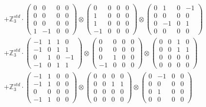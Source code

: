 \documentclass{article}
\begin{document}
{\begin{align}
        &+ \label{Rs16_Rc11_Solutions_Solution_6-c25} \mathbb{Z}_3^{std} \cdot 
            \begin{pmatrix} 0 & 0 & 0 & 0 \\ 0 & 0 & 0 & 0 \\ 0 & 0 & 0 & 0 \\ 1 & -1 & 0 & 0 \end{pmatrix} \otimes 
            \begin{pmatrix} 0 & 0 & 0 & 0 \\ 1 & 0 & 0 & 0 \\ 1 & 0 & 0 & 0 \\ -1 & 0 & 0 & 0 \end{pmatrix} \otimes 
            \begin{pmatrix} 0 & 1 & 0 & -1 \\ 0 & 0 & 0 & 0 \\ 0 & -1 & 0 & 1 \\ 0 & 0 & 0 & 0 \end{pmatrix} \\ 
        &+ \label{Rs16_Rc11_Solutions_Solution_6-c26} \mathbb{Z}_3^{std} \cdot 
            \begin{pmatrix} -1 & 1 & 1 & 0 \\ -1 & 0 & 1 & 1 \\ 0 & 1 & 0 & -1 \\ -1 & 0 & 1 & 1 \end{pmatrix} \otimes 
            \begin{pmatrix} 0 & 0 & 0 & 0 \\ 0 & 0 & 0 & 0 \\ 0 & 1 & 0 & 0 \\ -1 & 0 & 0 & 0 \end{pmatrix} \otimes 
            \begin{pmatrix} 0 & 0 & 1 & 0 \\ 0 & 0 & 1 & 1 \\ 0 & 0 & 0 & 0 \\ 0 & 0 & 0 & 0 \end{pmatrix} \\ 
        &+ \label{Rs16_Rc11_Solutions_Solution_6-c27} \mathbb{Z}_3^{std} \cdot 
            \begin{pmatrix} -1 & 1 & 0 & 0 \\ -1 & 1 & 0 & 0 \\ 0 & 0 & 0 & 0 \\ -1 & 1 & 0 & 0 \end{pmatrix} \otimes 
            \begin{pmatrix} 0 & 0 & 0 & 0 \\ 0 & 0 & 1 & 1 \\ 0 & 0 & 0 & 0 \\ 0 & 0 & 0 & 0 \end{pmatrix} \otimes 
            \begin{pmatrix} 0 & -1 & 0 & 0 \\ 0 & 0 & 0 & 0 \\ 0 & 1 & 0 & 0 \\ 0 & 0 & 0 & 0 \end{pmatrix} 
        \end{align}
        }
\end{document}
